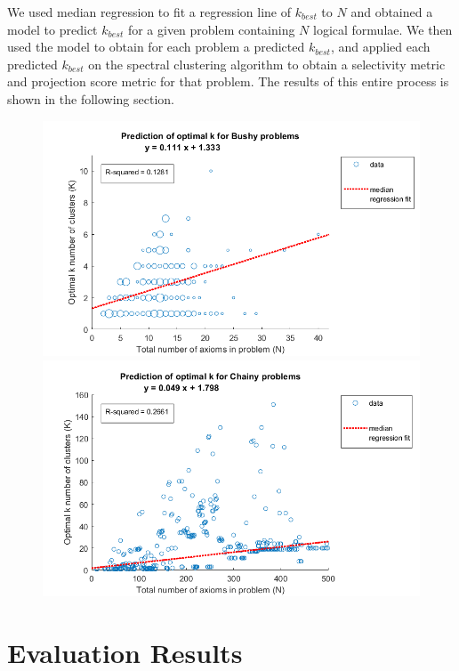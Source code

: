 \documentclass[EPiC]{easychair}
\begin{document}
We used median regression to fit a regression line of $k_{best}$ to $N$ and
obtained a model to predict $k_{best}$ for a given problem containing $N$
logical formulae. We then used the model to obtain for each problem a 
predicted $k_{best}$, and applied each predicted $k_{best}$ on the spectral
clustering algorithm to obtain a selectivity metric and projection score
metric for that problem. The results of this entire process is shown in the 
following section.

\begin{figure}[H]
\centering
\includegraphics[scale=0.34]{median-regression-optimal-k-bushy.png}
\includegraphics[scale=0.34]{median-regression-optimal-k-chainy.png}
\end{figure}

\section{Evaluation Results}
\label{Results}
\end{document}
